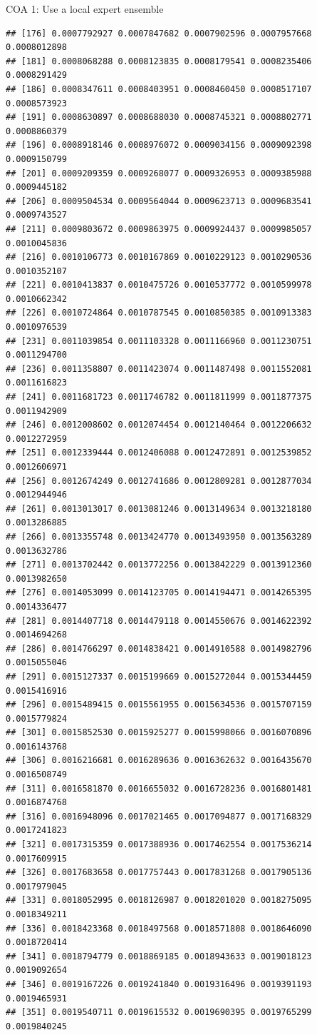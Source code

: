 \documentclass[ignorenonframetext,]{beamer}
\begin{document}
\begin{frame}[fragile]{COA 1: Use a local expert ensemble}
\begin{verbatim}
## [176] 0.0007792927 0.0007847682 0.0007902596 0.0007957668 0.0008012898
## [181] 0.0008068288 0.0008123835 0.0008179541 0.0008235406 0.0008291429
## [186] 0.0008347611 0.0008403951 0.0008460450 0.0008517107 0.0008573923
## [191] 0.0008630897 0.0008688030 0.0008745321 0.0008802771 0.0008860379
## [196] 0.0008918146 0.0008976072 0.0009034156 0.0009092398 0.0009150799
## [201] 0.0009209359 0.0009268077 0.0009326953 0.0009385988 0.0009445182
## [206] 0.0009504534 0.0009564044 0.0009623713 0.0009683541 0.0009743527
## [211] 0.0009803672 0.0009863975 0.0009924437 0.0009985057 0.0010045836
## [216] 0.0010106773 0.0010167869 0.0010229123 0.0010290536 0.0010352107
## [221] 0.0010413837 0.0010475726 0.0010537772 0.0010599978 0.0010662342
## [226] 0.0010724864 0.0010787545 0.0010850385 0.0010913383 0.0010976539
## [231] 0.0011039854 0.0011103328 0.0011166960 0.0011230751 0.0011294700
## [236] 0.0011358807 0.0011423074 0.0011487498 0.0011552081 0.0011616823
## [241] 0.0011681723 0.0011746782 0.0011811999 0.0011877375 0.0011942909
## [246] 0.0012008602 0.0012074454 0.0012140464 0.0012206632 0.0012272959
## [251] 0.0012339444 0.0012406088 0.0012472891 0.0012539852 0.0012606971
## [256] 0.0012674249 0.0012741686 0.0012809281 0.0012877034 0.0012944946
## [261] 0.0013013017 0.0013081246 0.0013149634 0.0013218180 0.0013286885
## [266] 0.0013355748 0.0013424770 0.0013493950 0.0013563289 0.0013632786
## [271] 0.0013702442 0.0013772256 0.0013842229 0.0013912360 0.0013982650
## [276] 0.0014053099 0.0014123705 0.0014194471 0.0014265395 0.0014336477
## [281] 0.0014407718 0.0014479118 0.0014550676 0.0014622392 0.0014694268
## [286] 0.0014766297 0.0014838421 0.0014910588 0.0014982796 0.0015055046
## [291] 0.0015127337 0.0015199669 0.0015272044 0.0015344459 0.0015416916
## [296] 0.0015489415 0.0015561955 0.0015634536 0.0015707159 0.0015779824
## [301] 0.0015852530 0.0015925277 0.0015998066 0.0016070896 0.0016143768
## [306] 0.0016216681 0.0016289636 0.0016362632 0.0016435670 0.0016508749
## [311] 0.0016581870 0.0016655032 0.0016728236 0.0016801481 0.0016874768
## [316] 0.0016948096 0.0017021465 0.0017094877 0.0017168329 0.0017241823
## [321] 0.0017315359 0.0017388936 0.0017462554 0.0017536214 0.0017609915
## [326] 0.0017683658 0.0017757443 0.0017831268 0.0017905136 0.0017979045
## [331] 0.0018052995 0.0018126987 0.0018201020 0.0018275095 0.0018349211
## [336] 0.0018423368 0.0018497568 0.0018571808 0.0018646090 0.0018720414
## [341] 0.0018794779 0.0018869185 0.0018943633 0.0019018123 0.0019092654
## [346] 0.0019167226 0.0019241840 0.0019316496 0.0019391193 0.0019465931
## [351] 0.0019540711 0.0019615532 0.0019690395 0.0019765299 0.0019840245

\end{verbatim}
\end{frame}
\end{document}
